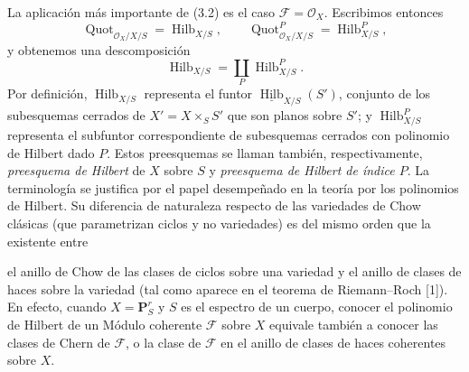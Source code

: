 \documentclass[11pt,twoside,openany]{book}
\numberwithin{equation}{section}
\newcommand{\src}[1]{%
  \phantomsection\hypertarget{src:#1}{}%
  \marginpar{\raggedleft\footnotesize\sffamily #1}%
}
\theoremstyle{plain}
\theoremstyle{definition}
\theoremstyle{remark}
\newcommand{\FgaUnitKey}{frontmatter}
\renewcommand{\src}[1]{%
  \phantomsection\hypertarget{src:\FgaUnitKey:#1}{}%
  \marginpar{\raggedleft\footnotesize\sffamily #1}%
}
\theoremstyle{plain}
\theoremstyle{definition}
\theoremstyle{remark}
\begin{document}
La aplicación más importante de (3.2) es el caso
$\mathcal F=\mathcal O_X$. Escribimos entonces
\[
\operatorname{Quot}_{\mathcal O_X/X/S}=\operatorname{Hilb}_{X/S},
\qquad
\operatorname{Quot}^P_{\mathcal O_X/X/S}=\operatorname{Hilb}^P_{X/S},
\]
y obtenemos una descomposición
\[
\operatorname{Hilb}_{X/S}=\coprod_P\operatorname{Hilb}^P_{X/S}.
\]
Por definición, $\operatorname{Hilb}_{X/S}$ representa el funtor
$\underline{\operatorname{Hilb}}_{X/S}(S')$, conjunto de los subesquemas
cerrados de $X'=X\times_SS'$ que son planos sobre $S'$; y
$\operatorname{Hilb}^P_{X/S}$ representa el subfuntor correspondiente de
subesquemas cerrados con polinomio de Hilbert dado $P$. Estos preesquemas se
llaman también, respectivamente, \emph{preesquema de Hilbert} de $X$ sobre
$S$ y \emph{preesquema de Hilbert de índice $P$}. La terminología se justifica
por el papel desempeñado en la teoría por los polinomios de Hilbert. Su
diferencia de naturaleza respecto de las variedades de Chow clásicas (que
parametrizan ciclos y no variedades) es del mismo orden que la existente entre
\src{266}
el anillo de Chow de las clases de ciclos sobre una variedad y el anillo de
clases de haces sobre la variedad (tal como aparece en el teorema de
Riemann--Roch [1]). En efecto, cuando $X=\mathbf P^r_S$ y $S$ es el espectro
de un cuerpo, conocer el polinomio de Hilbert de un Módulo coherente
$\mathcal F$ sobre $X$ equivale también a conocer las clases de Chern de
$\mathcal F$, o la clase de $\mathcal F$ en el anillo de clases de haces
coherentes sobre $X$.
\end{document}
